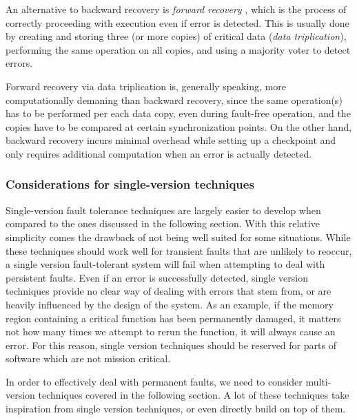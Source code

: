 An alternative to backward recovery is \textit{forward recovery} \cite{shubu}, which is the process of correctly proceeding with execution even if error is detected. This is usually done by creating and storing three (or more copies) of critical data (\textit{data triplication}), performing the same operation on all copies, and using a majority voter to detect errors.

Forward recovery via data triplication is, generally speaking, more computationally demaning than backward recovery, since the same operation(s) has to be performed per each data copy, even during fault-free operation, and the copies have to be compared at certain synchronization points. On the other hand, backward recovery incurs minimal overhead while setting up a checkpoint and only requires additional computation when an error is actually detected.

\subsubsection{Considerations for single-version techniques}

Single-version fault tolerance techniques are largely easier to develop when compared to the ones discussed in the following section. With this relative simplicity comes the drawback of not being well suited for some situations. While these techniques should work well for transient faults that are unlikely to reoccur, a single version fault-tolerant system will fail when attempting to deal with persistent faults. Even if an error is successfully detected, single version techniques provide no clear way of dealing with errors that stem from, or are heavily influenced by the design of the system. As an example, if the memory region containing a critical function has been permanently damaged, it matters not how many times we attempt to rerun the function, it will always cause an error. For this reason, single version techniques should be reserved for parts of software which are not mission critical.

In order to effectively deal with permanent faults, we need to consider multi-version techniques covered in the following section. A lot of these techniques take inspiration from single version techniques, or even directly build on top of them.